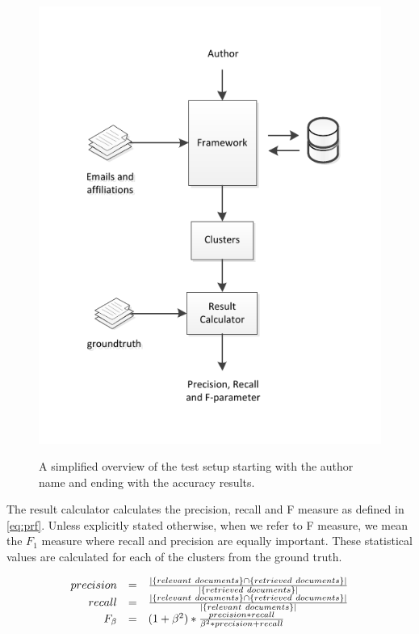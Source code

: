 \begin{figure}[htb]
	\centering
		\includegraphics{./fig/testsetup.pdf}
	\label{fig:testsetup}
	\caption{A simplified overview of the test setup starting with the author name and ending with the accuracy results.}
\end{figure}

The result calculator calculates the precision, recall and F measure as defined in \autoref{eq:prf}. Unless explicitly stated otherwise, when we refer to F measure, we mean the $F_{1}$ measure where recall and precision are equally important. These statistical values are calculated for each of the clusters from the ground truth. 

\begin{equation}
	\label{eq:prf}
	\begin{array}{r c l}
		precision & = & \frac{\left|\left\{relevant~documents\right\} \cap \left\{retrieved~documents\right\}\right|}{\left|\left\{retrieved~documents\right\}\right|} \\
		recall & = & \frac{\left|\left\{relevant~documents\right\} \cap \left\{retrieved~documents\right\}\right|}{\left|\left\{relevant~documents\right\}\right|} \\
		F_{\beta} & = & ( 1 + \beta^{2} ) * \frac{precision * recall}{\beta^{2} * precision + recall} \\
	\end{array}
\end{equation}

